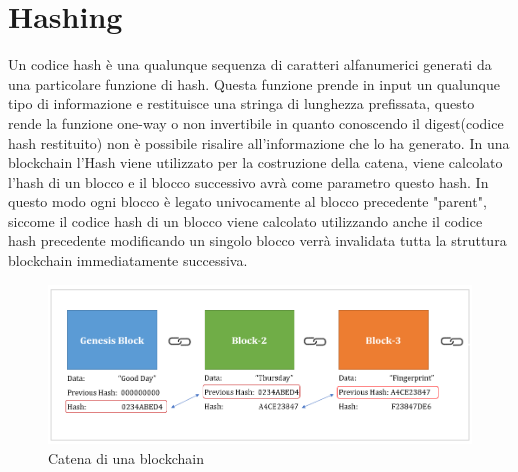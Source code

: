 \documentclass[11pt,a4paper,titlepage]{report}
\begin{document}
\section{Hashing}
Un codice hash è una qualunque sequenza di caratteri alfanumerici generati da una particolare funzione di hash. Questa funzione prende in input un qualunque tipo di informazione e restituisce una stringa di lunghezza prefissata, questo rende la funzione one-way o non invertibile in quanto conoscendo il digest(codice hash restituito) non è possibile risalire all'informazione che lo ha generato. In una blockchain l'Hash viene utilizzato per la costruzione della catena, viene calcolato l'hash di un blocco e il blocco successivo avrà come parametro questo hash. In questo modo ogni blocco è legato univocamente al blocco precedente "parent", siccome il codice hash di un blocco viene calcolato utilizzando anche il codice hash precedente modificando un singolo blocco verrà invalidata tutta la struttura blockchain immediatamente successiva.
\begin{figure}[h]
	\includegraphics[width=\textwidth]{bc1}
	\centering
	\caption{Catena di una blockchain}
	\label{fig:blockchain2}
\end{figure}
\end{document}
